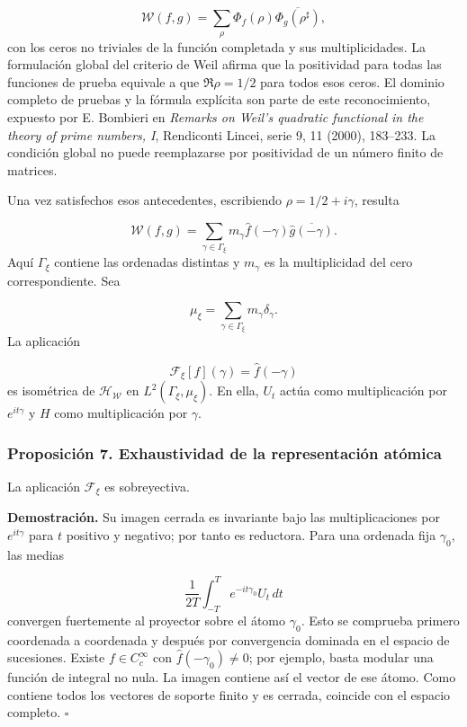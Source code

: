 \[
\mathscr W(f,g)=\sum_\rho
\Phi_f(\rho)\overline{\Phi_g(\rho^\sharp)},
\]
con los ceros no triviales de la función completada y sus multiplicidades. La formulación global del criterio de Weil afirma que la positividad para todas las funciones de prueba equivale a que \(\Re\rho=1/2\) para todos esos ceros. El dominio completo de pruebas y la fórmula explícita son parte de este reconocimiento, expuesto por E. Bombieri en \emph{Remarks on Weil's quadratic functional in the theory of prime numbers, I}, Rendiconti Lincei, serie 9, 11 (2000), 183–233. La condición global no puede reemplazarse por positividad de un número finito de matrices.

Una vez satisfechos esos antecedentes, escribiendo \(\rho=1/2+i\gamma\), resulta

\[
\mathscr W(f,g)
=\sum_{\gamma\in\Gamma_\xi}
m_\gamma\widehat f(-\gamma)\overline{\widehat g(-\gamma)}.
\]
Aquí \(\Gamma_\xi\) contiene las ordenadas distintas y \(m_\gamma\) es la multiplicidad del cero correspondiente. Sea

\[
\mu_\xi=\sum_{\gamma\in\Gamma_\xi}m_\gamma\delta_\gamma.
\]
La aplicación

\[
\mathcal F_\xi[f](\gamma)=\widehat f(-\gamma)
\]
es isométrica de \(\mathcal H_{\mathscr W}\) en \(L^2(\Gamma_\xi,\mu_\xi)\). En ella, \(U_t\) actúa como multiplicación por \(e^{it\gamma}\) y \(H\) como multiplicación por \(\gamma\).

\subsubsection*{Proposición 7. Exhaustividad de la representación atómica}
La aplicación \(\mathcal F_\xi\) es sobreyectiva.

\textbf{Demostración.} Su imagen cerrada es invariante bajo las multiplicaciones por \(e^{it\gamma}\) para \(t\) positivo y negativo; por tanto es reductora. Para una ordenada fija \(\gamma_0\), las medias

\[
\frac1{2T}\int_{-T}^T e^{-it\gamma_0}U_t\,dt
\]
convergen fuertemente al proyector sobre el átomo \(\gamma_0\). Esto se comprueba primero coordenada a coordenada y después por convergencia dominada en el espacio de sucesiones. Existe \(f\in C_c^\infty\) con \(\widehat f(-\gamma_0)\neq0\); por ejemplo, basta modular una función de integral no nula. La imagen contiene así el vector de ese átomo. Como contiene todos los vectores de soporte finito y es cerrada, coincide con el espacio completo. \hfill\(\square\)

